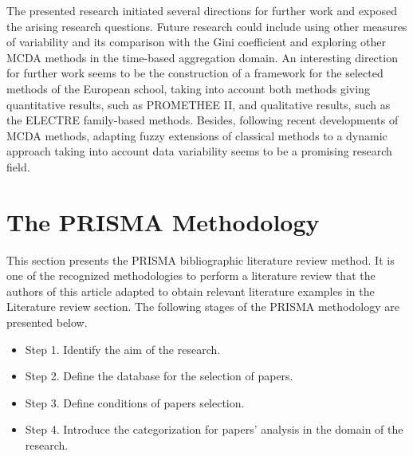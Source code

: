 \documentclass[final,5p,times,twocolumn,authoryear]{elsarticle}
\newcounter{example}[section]
\begin{document}
The presented research initiated several directions for further work and exposed the arising research questions. Future research could include using other measures of variability and its comparison with the Gini coefficient and exploring other MCDA methods in the time-based aggregation domain. An interesting direction for further work seems to be the construction of a framework for the selected methods of the European school, taking into account both methods giving quantitative results, such as PROMETHEE II, and qualitative results, such as the ELECTRE family-based methods. Besides, following recent developments of MCDA methods, adapting fuzzy extensions of classical methods to a dynamic approach taking into account data variability seems to be a promising research field. 

\appendix
\label{sec:app}
\section{The PRISMA Methodology}
\label{sec:appPRISMA}
This section presents the PRISMA bibliographic literature review method. It is one of the recognized methodologies to perform a literature review that the authors of this article adapted to obtain relevant literature examples in the Literature review section. The following stages of the PRISMA methodology are presented below.

\begin{itemize}
    \item {Step 1. Identify the aim of the research.}
    \item {Step 2. Define the database for the selection of papers.}
    \item {Step 3. Define conditions of papers selection.}
    \item {Step 4. Introduce the categorization for papers' analysis in the domain of the research.}
\end{itemize}
\end{document}
